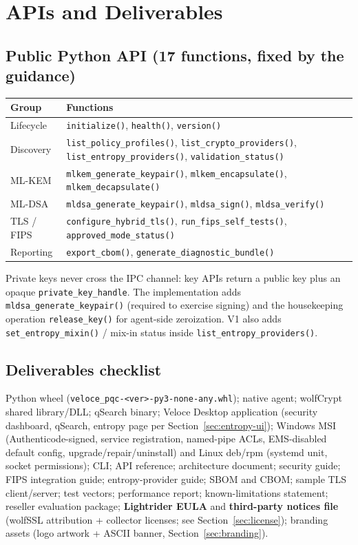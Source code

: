 \documentclass[10pt]{article}
\newcommand{\code}[1]{\texttt{\small #1}}
\begin{document}
\section{APIs and Deliverables}\label{sec:api}

\subsection{Public Python API (17 functions, fixed by the guidance)}
\begin{small}
\begin{tabularx}{\textwidth}{@{}lL@{}}
\toprule
\textbf{Group} & \textbf{Functions} \\
\midrule
Lifecycle & \code{initialize()}, \code{health()}, \code{version()} \\
Discovery & \code{list\_policy\_profiles()}, \code{list\_crypto\_providers()},
  \code{list\_entropy\_providers()}, \code{validation\_status()} \\
ML-KEM & \code{mlkem\_generate\_keypair()}, \code{mlkem\_encapsulate()},
  \code{mlkem\_decapsulate()} \\
ML-DSA & \code{mldsa\_generate\_keypair()}, \code{mldsa\_sign()},
  \code{mldsa\_verify()} \\
TLS / FIPS & \code{configure\_hybrid\_tls()}, \code{run\_fips\_self\_tests()},
  \code{approved\_mode\_status()} \\
Reporting & \code{export\_cbom()}, \code{generate\_diagnostic\_bundle()} \\
\bottomrule
\end{tabularx}
\end{small}

Private keys never cross the IPC channel: key APIs return a public key plus an opaque
\code{private\_key\_handle}. The implementation adds
\code{mldsa\_generate\_keypair()} (required to exercise signing) and the housekeeping
operation \code{release\_key()} for agent-side zeroization. V1 also adds
\code{set\_entropy\_mixin()} / mix-in status inside
\code{list\_entropy\_providers()}.

\subsection{Deliverables checklist}
Python wheel (\code{veloce\_pqc-<ver>-py3-none-any.whl}); native agent; wolfCrypt shared
library/DLL; qSearch binary; Veloce Desktop application (security dashboard, qSearch,
entropy page per Section~\ref{sec:entropy-ui}); Windows MSI (Authenticode-signed,
service registration, named-pipe ACLs, EMS-disabled default config,
upgrade/repair/uninstall) and Linux
deb/rpm (systemd unit, socket permissions); CLI; API reference; architecture document;
security guide; FIPS integration guide; entropy-provider guide; SBOM and CBOM; sample TLS
client/server; test vectors; performance report; known-limitations statement; reseller
evaluation package; \textbf{Lightrider EULA} and \textbf{third-party notices file}
(wolfSSL attribution + collector licenses; see Section~\ref{sec:license}); branding
assets (logo artwork + ASCII banner, Section~\ref{sec:branding}).
\end{document}

